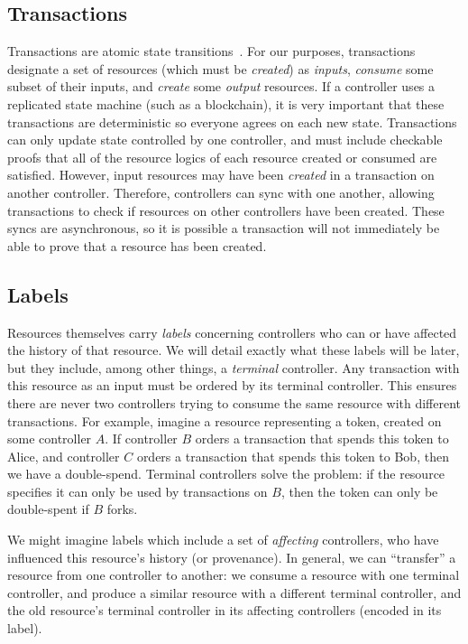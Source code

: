 \documentclass[a4paper,USenglish,cleveref, autoref, thm-restate, anonymous]{lipics-v2021}
\begin{document}
\subsection{Transactions}
Transactions are atomic state transitions~\cite{smr,statemachine}.
For our purposes, transactions designate a set of resources (which must be \emph{created}) as \emph{inputs}, \emph{consume} some subset of their inputs, and \emph{create} some \emph{output} resources.
If a controller uses a replicated state machine (such as a blockchain), it is very important that these transactions are deterministic so everyone agrees on each new state.
Transactions can only update state controlled by one controller, and must include checkable proofs that all of the resource logics of each resource created or consumed are satisfied.
However, input resources may have been \emph{created} in a transaction on another controller.
Therefore, controllers can sync with one another, allowing transactions to check if resources on other controllers have been created.
These syncs are asynchronous, so it is possible a transaction will not immediately be able to prove that a resource has been created.

\subsection{Labels}
Resources themselves carry \emph{labels} concerning controllers who can or have affected the history of that resource.
We will detail exactly what these labels will be later, but they include, among other things, a \textit{terminal} controller.
Any transaction with this resource as an input must be ordered by its terminal controller.
This ensures there are never two controllers trying to consume the same resource with different transactions.
For example, imagine a resource representing a token, created on some controller $A$.
If controller $B$ orders a transaction that spends this token to Alice, and controller $C$ orders a transaction that spends this token to Bob, then we have a double-spend.
Terminal controllers solve the problem: if the resource specifies it can only be used by transactions on $B$, then the token can only be double-spent if $B$ forks.

We might imagine labels which include a set of \textit{affecting} controllers, who have influenced this resource's history (or provenance).
In general, we can ``transfer'' a resource from one controller to another: we consume a resource with one terminal controller, and produce a similar resource with a different terminal controller, and the old resource's terminal controller in its affecting controllers (encoded in its label). 
\end{document}
